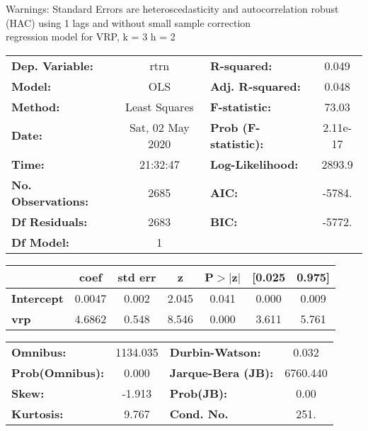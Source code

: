 Warnings: \newline
 [1] Standard Errors are heteroscedasticity and autocorrelation robust (HAC) using 1 lags and without small sample correction\\ 

regression model for VRP, k = 3 h = 2\begin{center}
\begin{tabular}{lclc}
\toprule
\textbf{Dep. Variable:}    &       rtrn       & \textbf{  R-squared:         } &     0.049   \\
\textbf{Model:}            &       OLS        & \textbf{  Adj. R-squared:    } &     0.048   \\
\textbf{Method:}           &  Least Squares   & \textbf{  F-statistic:       } &     73.03   \\
\textbf{Date:}             & Sat, 02 May 2020 & \textbf{  Prob (F-statistic):} &  2.11e-17   \\
\textbf{Time:}             &     21:32:47     & \textbf{  Log-Likelihood:    } &    2893.9   \\
\textbf{No. Observations:} &        2685      & \textbf{  AIC:               } &    -5784.   \\
\textbf{Df Residuals:}     &        2683      & \textbf{  BIC:               } &    -5772.   \\
\textbf{Df Model:}         &           1      & \textbf{                     } &             \\
\bottomrule
\end{tabular}
\begin{tabular}{lcccccc}
                   & \textbf{coef} & \textbf{std err} & \textbf{z} & \textbf{P$> |$z$|$} & \textbf{[0.025} & \textbf{0.975]}  \\
\midrule
\textbf{Intercept} &       0.0047  &        0.002     &     2.045  &         0.041        &        0.000    &        0.009     \\
\textbf{vrp}       &       4.6862  &        0.548     &     8.546  &         0.000        &        3.611    &        5.761     \\
\bottomrule
\end{tabular}
\begin{tabular}{lclc}
\textbf{Omnibus:}       & 1134.035 & \textbf{  Durbin-Watson:     } &    0.032  \\
\textbf{Prob(Omnibus):} &   0.000  & \textbf{  Jarque-Bera (JB):  } & 6760.440  \\
\textbf{Skew:}          &  -1.913  & \textbf{  Prob(JB):          } &     0.00  \\
\textbf{Kurtosis:}      &   9.767  & \textbf{  Cond. No.          } &     251.  \\
\bottomrule
\end{tabular}
\end{center}

